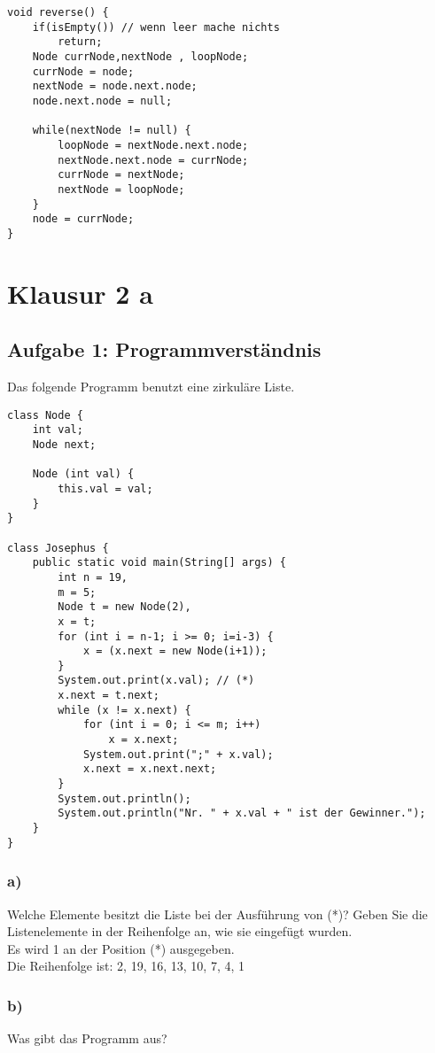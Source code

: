 \documentclass[a4paper, 10pt]{article}
\begin{document}
\begin{lstlisting}
void reverse() {
    if(isEmpty()) // wenn leer mache nichts
        return;
    Node currNode,nextNode , loopNode;
    currNode = node; 
    nextNode = node.next.node; 
    node.next.node = null;

    while(nextNode != null) {
        loopNode = nextNode.next.node;
        nextNode.next.node = currNode;
        currNode = nextNode;
        nextNode = loopNode;
    }
    node = currNode;
}
\end{lstlisting}

\section*{Klausur 2 a}
\subsection*{Aufgabe 1: Programmverständnis}
Das folgende Programm benutzt eine zirkuläre Liste.
\begin{lstlisting}
class Node {
	int val;
	Node next;
	
	Node (int val) {
		this.val = val;
	}
}

class Josephus {
	public static void main(String[] args) {
		int n = 19,
		m = 5;
		Node t = new Node(2),
		x = t;
		for (int i = n-1; i >= 0; i=i-3) {
			x = (x.next = new Node(i+1));
		}
		System.out.print(x.val); // (*)
		x.next = t.next;
		while (x != x.next) {
			for (int i = 0; i <= m; i++)
				x = x.next;
			System.out.print(";" + x.val);
			x.next = x.next.next;
		}
		System.out.println();
		System.out.println("Nr. " + x.val + " ist der Gewinner.");
	}
}
\end{lstlisting}

\subsubsection*{a)}
Welche Elemente besitzt die Liste bei der Ausführung von (*)? Geben Sie die Listenelemente in der Reihenfolge an, wie sie eingefügt wurden.\\

Es wird 1 an der Position (*) ausgegeben.\\

Die Reihenfolge ist: 2, 19, 16, 13, 10, 7, 4, 1

\subsubsection*{b)}
Was gibt das Programm aus?\\
\end{document}
